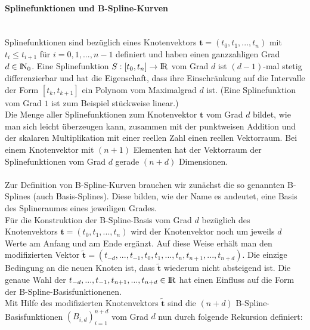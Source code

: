\documentclass{article}
\newcommand{\R}{{\rm I\!R}}
\newcommand{\N}{{\rm I\!N}}
\begin{document}
\paragraph{Splinefunktionen und B-Spline-Kurven}~\\
Splinefunktionen sind bezüglich eines Knotenvektors $\mathbf{t}=(t_0,t_1,...,t_n)$ mit $t_i \le t_{i+1}$ für $i=0,1,...,n-1$ definiert und haben einen ganzzahligen Grad $d\in\N_0$. Eine Splinefunktion $S:[t_0,t_n]\rightarrow\R$ vom Grad $d$ ist $(d-1)$-mal stetig differenzierbar und hat die Eigenschaft, dass ihre Einschränkung auf die Intervalle der Form $[t_k,t_{k+1}]$ ein Polynom vom Maximalgrad $d$ ist. (Eine Splinefunktion vom Grad $1$ ist zum Beispiel stückweise linear.)\\
Die Menge aller Splinefunktionen zum Knotenvektor $\mathbf{t}$ vom Grad $d$
bildet, wie man sich leicht überzeugen kann, zusammen mit der punktweisen Addition und der skalaren Multiplikation mit einer reellen Zahl einen reellen Vektorraum. Bei einem Knotenvektor mit $(n+1)$ Elementen hat der Vektorraum der Splinefunktionen vom Grad $d$ gerade $(n+d)$ Dimensionen.\\
\\
Zur Definition von B-Spline-Kurven brauchen wir zunächst die so genannten B-Splines (auch Basis-Splines). Diese bilden, wie der Name es andeutet, eine Basis des Splineraumes eines jeweiligen Grades.\\
Für die Konstruktion der B-Spline-Basis vom Grad $d$ bezüglich des Knotenvektors $\mathbf{t}=(t_0,t_1,...,t_n)$ wird der Knotenvektor noch um jeweils $d$ Werte am Anfang und am Ende ergänzt. Auf diese Weise erhält man den modifizierten Vektor $\mathbf{\tilde{t}}=(t_{-d},...,t_{-1},t_0,t_1,...,t_n,t_{n+1},...,t_{n+d})$. Die einzige Bedingung an die neuen Knoten ist, dass $\mathbf{\tilde{t}}$ wiederum nicht absteigend ist. Die genaue Wahl der $t_{-d},...,t_{-1},t_{n+1},...,t_{n+d}\in\R$ hat einen Einfluss auf die Form der B-Spline-Basisfunktionenen.\\
Mit Hilfe des modifizierten Knotenvektors $\mathbf{\tilde{t}}$ sind die $(n+d)$ B-Spline-Basisfunktionen $(B_{i,d})_{i=1}^{n+d}$ vom Grad $d$ nun durch folgende Rekursion definiert:
\end{document}

